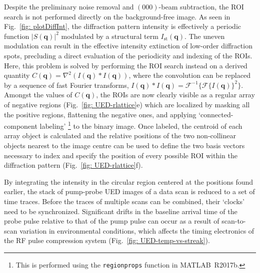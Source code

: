 Despite the preliminary noise removal and $(000)$-beam subtraction,
the ROI search is not performed directly on the background-free image.
As seen in Fig.~\ref{fig: plotDiffInt}, the diffraction pattern intensity
is effectively a periodic function $|S(\boldsymbol{q})|^2$ modulated by
a structural term $I_\text{st}(\boldsymbol{q})$.
The uneven modulation can result in the effective intensity extinction of low-order diffraction spots,
precluding a direct evaluation of the periodicity and indexing of the ROIs.
Here, this problem is solved by performing the ROI search instead on
a derived quantity $C(\boldsymbol{q}) = \nabla^2 \left( I(\boldsymbol{q}) \ast I(\boldsymbol{q}) \right)$,
where the convolution can be replaced by a sequence of fast Fourier transforms,
$I(\boldsymbol{q}) \ast I(\boldsymbol{q}) =
\mathcal{F}^{-1}\{ \mathcal{F}\{I(\boldsymbol{q})\}^2\}$.
%
Amongst the values of $C(\boldsymbol{q})$, the ROIs are now clearly visible
as a regular array of negative regions (Fig.~\ref{fig: UED-rlattice}e)
which are localized by masking all the positive regions, flattening the negative ones,
and applying `connected-component labeling'%
\footnote{This is performed using the \texttt{regionprops} function
in \textsc{MATLAB}~R2017b.} to the binary image.
%
Once labeled, the centroid of each array object is calculated and
the relative positions of the two non-collinear objects nearest to the image centre
can be used to define the two basis vectors necessary to index and specify
the position of every possible ROI within the diffraction pattern (Fig.~\ref{fig: UED-rlattice}f).

By integrating the intensity in the circular region centered at the positions found earlier,
the stack of pump-probe UED images of a data scan is reduced to a set of time traces.
Before the traces of multiple scans can be combined, their `clocks' need to be synchronized.
%
Significant drifts in the baseline arrival time of the probe pulse relative to that of the pump pulse
can occur as a result of scan-to-scan variation in environmental conditions,
which affects the timing electronics of the RF pulse compression system (Fig.~\ref{fig: UED-temp-vs-streak}).


